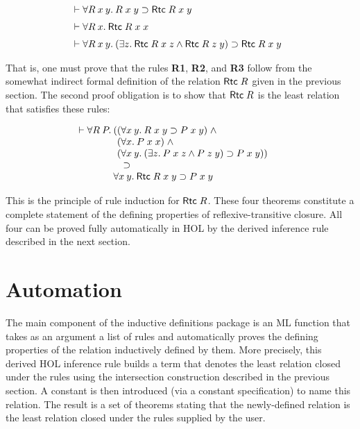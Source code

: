 \[ \begin{array}[t]{@{}l}
   \vdash \forall R\:x\:y.\:R\;x\;y \supset {\sf Rtc}\;R\;x\;y \\[2mm]
   \vdash \forall R\:x.\:{\sf Rtc}\;R\;x\;x \\[2mm]
   \vdash \forall R\:x\:y.\:
        (\exists z.\:{\sf Rtc}\;R\;x\;z \wedge {\sf Rtc}\;R\;z\;y) \supset
        {\sf Rtc}\;R\;x\;y 
\end{array}\]

\noindent That is, one must prove that the rules {{\small\bf R}\bf 1},
{{\small\bf R}\bf 2}, and {{\small\bf R}\bf 3} follow from the somewhat
indirect formal definition of the relation ${\sf Rtc}\;R$ given in the previous
section.  The second proof obligation is to show that ${\sf Rtc}\;R$ is the
least relation that satisfies these rules:

\[\vdash \begin{array}[t]{@{}l}
\forall R\:P.\:\begin{array}[t]{@{}l}
  (\begin{array}[t]{@{}l}
  (\forall x\:y.\:R\;x\;y \supset P\;x\;y)\; \wedge \\
  (\forall x.\:P\;x\;x)\; \wedge \\
  (\forall x\:y.\:(\exists z.\:P\;x\;z \wedge P\;z\;y)
    \supset P\;x\;y))\end{array}\\
\quad\supset\\
\forall x\:y.\: {\sf Rtc}\;R\;x\;y \supset P\;x\;y
\end{array}\end{array}\]

\noindent This is the principle of rule induction for ${\sf Rtc}\;R$.  These
four theorems constitute a complete statement of the defining properties of
reflexive-transitive closure. All four can be proved fully automatically in
{\small HOL} by the derived inference rule described in the next section.

\section{Automation}\label{newind}

The main component of the inductive definitions package is an {\small ML}
function that takes as an argument a list of rules and automatically proves the
defining properties of the \mbox{relation} inductively defined by them.  More
precisely, this derived {\small HOL} inference rule builds a term that denotes
the least relation closed under the rules using the intersection construction
described in the previous section.  A constant is then introduced (via a
constant specification) to name this relation.  The result is a set of theorems
stating that the newly-defined relation is the least relation closed under the
rules supplied by the user.

